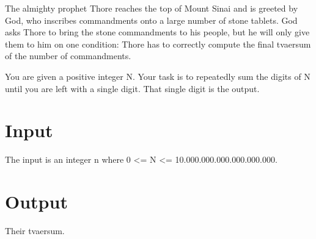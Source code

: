 

The almighty prophet Thore reaches the top of Mount Sinai and is greeted by God, who inscribes commandments onto a large number of stone tablets. God asks Thore to bring the stone commandments to his people, but he will only give them to him on one condition: Thore has to correctly compute the final tvaersum of the number of commandments.

You are given a positive integer N. Your task is to repeatedly sum the digits of N until you are left with a single digit. That single digit is the output.

\section*{Input}

The input is an integer n where 0 <= N <= 10.000.000.000.000.000.000.

\section*{Output}

Their tvaersum.
